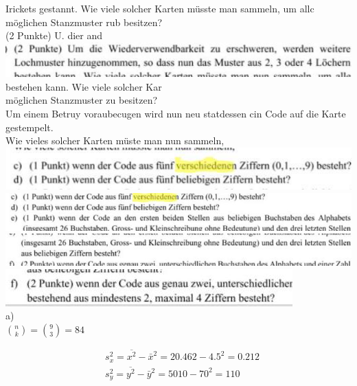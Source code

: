 \documentclass[10pt]{article}
\begin{document}
{Irickets gestannt. Wie viele solcher Karten müsste man sammeln, um allc\\
möglichen Stanzmuster rub besitzen?\\
(2 Punkte) U. dier and\\
\includegraphics[max width=\textwidth]{2024_12_29_0906b02acf849bda8665g-4(7)} bestehen kann. Wie viele solcher Kar\\
möglichen Stanzmuster zu besitzen?\\
Um einem Betruy voraubecugen wird nun neu statdessen cin Code auf die Karte gestempelt.\\
Wie vieles solcher Karten müste man nun sammeln,\\
\includegraphics[max width=\textwidth, center]{2024_12_29_0906b02acf849bda8665g-4}\\
\includegraphics[max width=\textwidth, center]{2024_12_29_0906b02acf849bda8665g-4(3)}\\
\includegraphics[max width=\textwidth, center]{2024_12_29_0906b02acf849bda8665g-4(5)}\\
\includegraphics[max width=\textwidth, center]{2024_12_29_0906b02acf849bda8665g-4(4)}\\
a)\\
$\binom{n}{k}=\binom{9}{3}=84$

$$
\begin{aligned}
& s_{x}^{2}=\overline{x^{2}}-\bar{x}^{2}=20.462-4.5^{2}=0.212 \\
& s_{y}^{2}=\overline{y^{2}}-\bar{y}^{2}=5010-70^{2}=110
\end{aligned}
$$

}
\end{document}
